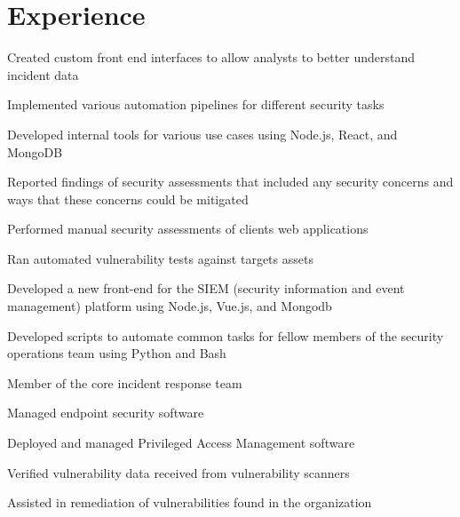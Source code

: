 \documentclass[12pt]{resume}
\begin{document}
\begin{minipage}[t]{0.66\textwidth} 


\section{Experience}
\newline
{}
\vspace{\topsep} %
\begin{tightemize}
\item Created custom front end interfaces to allow analysts to better understand incident data
\item Implemented various automation pipelines for different security tasks
\item Developed internal tools for various use cases using Node.js, React, and MongoDB
\end{tightemize}
\sectionsep

\newline
{}
\begin{tightemize}
\item Reported findings of security assessments that included any security concerns and ways that these concerns could be mitigated
\item Performed manual security assessments of clients web applications
\item Ran automated vulnerability tests against targets assets
\end{tightemize}
\sectionsep

\newline
{}
\begin{tightemize}
\item Developed a new front-end for the SIEM (security information and event management) platform
using Node.js, Vue.js, and Mongodb
\item Developed scripts to automate common tasks for fellow members of the security operations team using Python and Bash
\item Member of the core incident response team
\item Managed endpoint security software
\item Deployed and managed Privileged Access Management software
\item Verified vulnerability data received from vulnerability scanners
\item Assisted in remediation of vulnerabilities found in the organization
\end{tightemize}
\sectionsep


\end{minipage}
\end{document}
